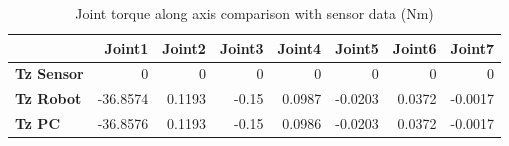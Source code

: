 \begin{table}[h!]
	\centering
	\caption{Joint torque along axis comparison with sensor data (Nm)}
	\label{wrech_Sensor_Pose15}
	\begin{tabular}{|l|r|r|r|r|r|r|r|}
		\hline
		\textbf{} & \textbf{Joint1} & \textbf{Joint2} & \textbf{Joint3} & \textbf{Joint4} & \textbf{Joint5} & \textbf{Joint6} & \textbf{Joint7} \\ \hline
		\textbf{Tz Sensor}  & 0           & 0           & 0            & 0           & 0           & 0           & 0           \\ \hline
		\textbf{Tz Robot}  	& -36.8574           & 0.1193           & -0.15            & 0.0987           & -0.0203           & 0.0372           & -0.0017           \\ \hline
		\textbf{Tz PC}  	& -36.8576           & 0.1193           & -0.15            & 0.0986           & -0.0203           & 0.0372           & -0.0017           \\ \hline
	\end{tabular}
\end{table}

